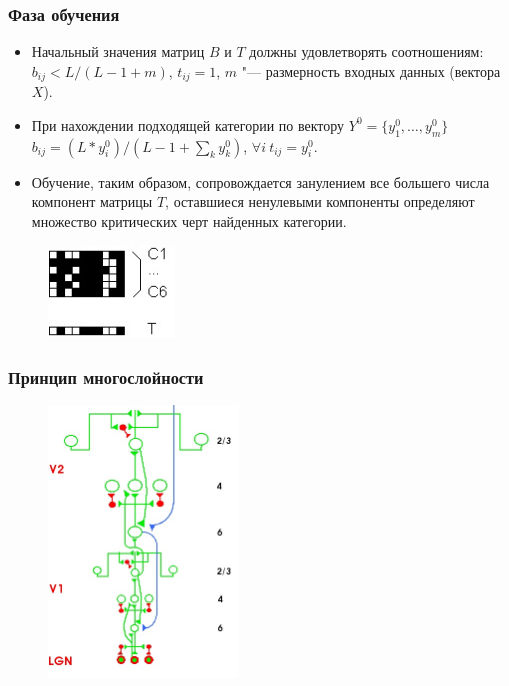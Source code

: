 \documentclass[default]{beamer}
\begin{document}
	\begin{frame}
		\frametitle{Фаза обучения}
		
		\begin{itemize}
			\item Начальный значения матриц $B$ и $T$ должны удовлетворять соотношениям: $b_{ij}<L/(L-1+m)$, $t_{ij}=1$, $m$ "--- размерность входных данных (вектора $X$).
			\item При нахождении подходящей категории по вектору $Y^0=\{y_1^0,\dots,y_m^0\}$ $b_{ij}=(L*y_i^0)/(L-1+\sum_k y_k^0)$, $\forall i\ t_{ij}=y_i^0$.
			\item Обучение, таким образом, сопровождается занулением все большего числа компонент матрицы $T$, оставшиеся ненулевыми компоненты определяют множество критических черт найденных категории.
		\end{itemize}
		\begin{figure}
			\includegraphics[width=0.3\textwidth]{art_learn}
		\end{figure}
	\end{frame}

	\begin{frame}
		\frametitle{Принцип многослойности}
		
		\begin{figure}
			\includegraphics[width=0.45\textwidth]{art_neuro}
		\end{figure}
	\end{frame}
			
\end{document}
